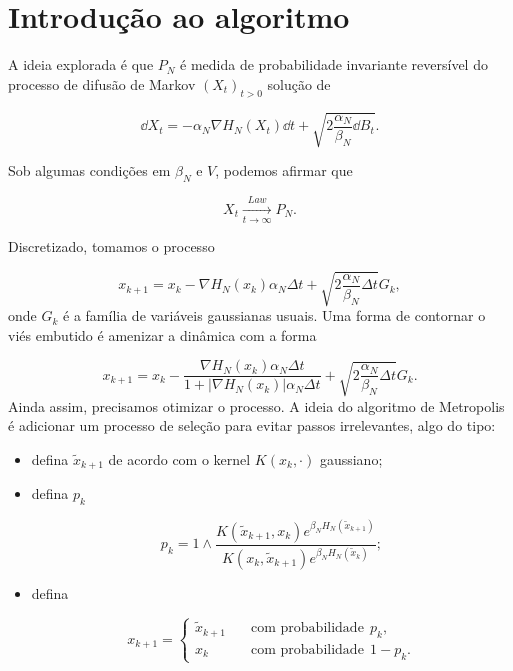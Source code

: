 \section{Introdução ao algoritmo}

A ideia explorada é que $P_N$ é medida de probabilidade invariante reversível do processo de difusão de Markov $(X_t)_{t>0}$ solução de

\[
\dd X_t = -\alpha_N \nabla H_N(X_t) \dd t + \sqrt{2\frac{\alpha_N}{\beta_N} \dd B_t}.
\]

Sob algumas condições em $\beta_N$ e $V$, podemos afirmar que

\[
X_t \xrightarrow[t \rightarrow \infty]{Law} P_N.
\]

Discretizado, tomamos o processo

\[
x_{k+1} = x_k - \nabla H_N(x_k) \alpha_N \Delta t + \sqrt{2\frac{\alpha_N}{\beta_N} \Delta t} G_k,
\]
onde $G_k$ é a família de variáveis gaussianas usuais. Uma forma de contornar o viés embutido é amenizar a dinâmica com a forma

\[
x_{k+1} = x_k - \frac{\nabla H_N(x_k) \alpha_N \Delta t}{1 + |\nabla H_N(x_k)| \alpha_N \Delta t} + \sqrt{2\frac{\alpha_N}{\beta_N} \Delta t} G_k.
\]
Ainda assim, precisamos otimizar o processo. A ideia do algoritmo de Metropolis é adicionar um processo de seleção para evitar passos irrelevantes, algo do tipo:

\begin{itemize}
	\item defina $\tilde{x}_{k+1}$ de acordo com o kernel $K(x_k, \cdot)$ gaussiano;
	
	\item defina $p_k$
	
	\[
	p_k = 1 \wedge \frac{K(\tilde{x}_{k+1},x_k) e^{\beta_N H_N(\tilde{x}_{k+1})}}{K(x_{k},\tilde{x}_{k+1}) e^{\beta_N H_N(\tilde{x}_{k})}};
	\]
	
	\item defina
	
	\[
	x_{k+1} = 
	\begin{cases}
		\tilde{x}_{k+1} & \quad \text{com probabilidade} \ \ p_k,\\
		x_k &  \quad \text{com probabilidade} \ \ 1-p_k.
	\end{cases}
	\]
	
\end{itemize}
